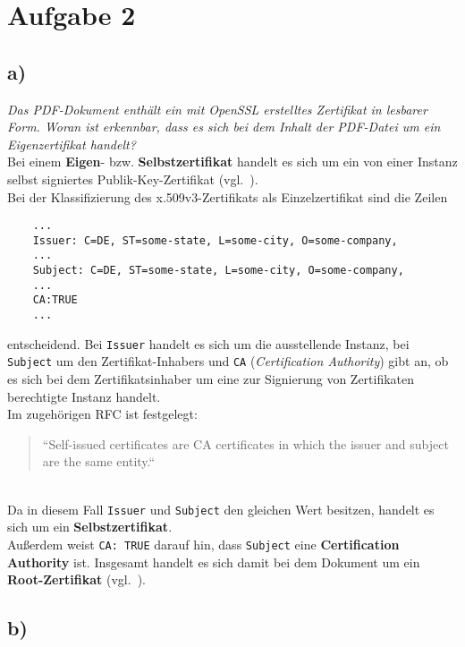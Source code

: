 \chapter{Aufgabe 2}

\section{a)}

\textit{Das PDF-Dokument enthält ein mit OpenSSL erstelltes Zertifikat in lesbarer Form.
Woran ist erkennbar, dass es sich bei dem Inhalt der PDF-Datei um ein Eigenzertifikat handelt?}\\

\noindent
Bei einem \textbf{Eigen}- bzw. \textbf{Selbstzertifikat} handelt es sich um ein von einer Instanz selbst signiertes Publik-Key-Zertifikat (vgl.~\cite[44]{ITS6}).\\
Bei der Klassifizierung des x.509v3-Zertifikats als Einzelzertifikat sind die Zeilen

\begin{verbatim}
    ...
    Issuer: C=DE, ST=some-state, L=some-city, O=some-company,
    ...
    Subject: C=DE, ST=some-state, L=some-city, O=some-company,
    ...
    CA:TRUE
    ...
\end{verbatim}

\noindent
entscheidend.
Bei \texttt{Issuer} handelt es sich um die ausstellende Instanz, bei \texttt{Subject} um den Zertifikat-Inhabers und \texttt{CA} (\textit{Certification Authority}) gibt an, ob es sich bei dem Zertifikatsinhaber um eine zur Signierung von Zertifikaten berechtigte Instanz handelt.\\

\noindent
Im zugehörigen RFC ist festgelegt:

\blockquote[\cite{RFC5280}]{
``Self-issued certificates are CA certificates in which
the issuer and subject are the same entity.``
}\\

\noindent
Da in diesem Fall \texttt{Issuer} und \texttt{Subject} den gleichen Wert besitzen, handelt es sich um ein \textbf{Selbstzertifikat}.\\
Außerdem weist \texttt{CA: TRUE} darauf hin, dass \texttt{Subject} eine \textbf{Certification Authority} ist.
Insgesamt handelt es sich damit bei dem Dokument um ein \textbf{Root-Zertifikat} (vgl.~\cite[25]{ITS6}).


\section{b)}

